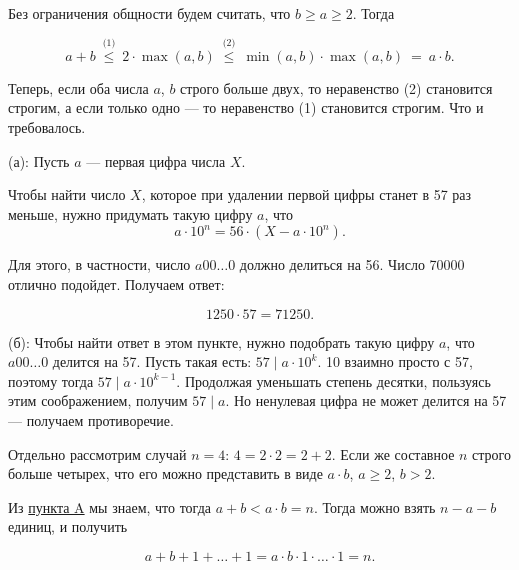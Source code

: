 ﻿
\begin{itemize}

\itA \label{small-n-big-a} Без ограничения общности будем считать, что $b \geq a \geq 2$. Тогда

\vspace{-0.4cm}
$$a+b\ \stackrel{\text{(1)}}{\leq}\ 
	2 \cdot\max(a,b)\ \stackrel{\text{(2)}}{\leq}\ 
	\min(a,b) \cdot \max(a,b)\ =\ a\cdot b.$$

\noindent Теперь, если оба числа $a$, $b$ строго больше двух, то неравенство (2) становится строгим, а если только одно — то неравенство (1) становится строгим. Что и требовалось.

\itB (а): Пусть $a$ — первая цифра числа $X$.

Чтобы найти число $X$, которое при удалении первой цифры станет в 57 раз меньше, нужно придумать такую цифру $a$, что
	$$a \cdot 10^n = 56 \cdot (X - a \cdot 10^n).$$

Для этого, в частности, число $a00\ldots 0$ должно делиться на 56. Число 70000 отлично подойдет. Получаем ответ:

\vspace{-0.4cm}
$$1250 \cdot 57 = 71250.$$

(б): Чтобы найти ответ в этом пункте, нужно подобрать такую цифру $a$, что $a00\ldots0$ делится на 57. Пусть такая есть: $57 \mid a \cdot 10^k$. 10 взаимно просто с 57, поэтому тогда $57 \mid a\cdot 10^{k-1}$. Продолжая уменьшать степень десятки, пользуясь этим соображением, получим $57 \mid a$. Но ненулевая цифра не может делится на 57 — получаем противоречие.

\itC Отдельно рассмотрим случай $n=4$: $4 = 2 \cdot 2 = 2 + 2$. Если же составное $n$ строго больше четырех, что его можно представить в виде $a \cdot b$, $a \geq 2$, $b > 2$. 

Из \hyperref[small-n-big-a]{пункта A} мы знаем, что тогда $a+b < a \cdot b = n$. Тогда можно взять $n-a-b$ единиц, и получить

\vspace{-0.4cm}
$$a+b+1+\ldots+1 = a\cdot b \cdot 1 \cdot \ldots \cdot 1 = n.$$
\end{itemize}
